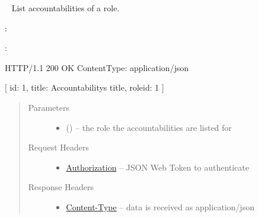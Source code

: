 \documentclass[letterpaper,10pt,english]{sphinxmanual}
\begin{document}
\begin{DUlineblock}{0em}
\item[] 
\end{DUlineblock}


\begin{fulllineitems}
\label{\detokenize{resources/role:get--roles-(role_id)-accountabilities}}~
List accountabilities of a role.

:

\begin{sphinxVerbatim}[commandchars=\\\{\}]
  
 
 
\end{sphinxVerbatim}

:

\begin{sphinxVerbatim}[commandchars=\\\{\}]
HTTP/1.1 200 OK
Content\PYGZhy{}Type: application/json

[
    \PYGZob{}
        \PYGZsq{}id\PYGZsq{}: 1,
        \PYGZsq{}title\PYGZsq{}: \PYGZsq{}Accountability\PYGZsq{}s title\PYGZsq{},
        \PYGZsq{}role\PYGZus{}id\PYGZsq{}: 1
    \PYGZcb{}
]
\end{sphinxVerbatim}
\begin{quote}\begin{description}
\item[{Parameters}] \leavevmode\begin{itemize}
\item {} 
 () -- the role the accountabilities are listed for

\end{itemize}

\item[{Request Headers}] \leavevmode\begin{itemize}
\item {} 
\href{http://tools.ietf.org/html/rfc7235\#section-4.2}{Authorization} -- JSON Web Token to authenticate

\end{itemize}

\item[{Response Headers}] \leavevmode\begin{itemize}
\item {} 
\href{http://tools.ietf.org/html/rfc7231\#section-3.1.1.5}{Content-Type} -- data is received as application/json


\end{itemize}
\end{description}
\end{quote}
\end{fulllineitems}
\end{document}
